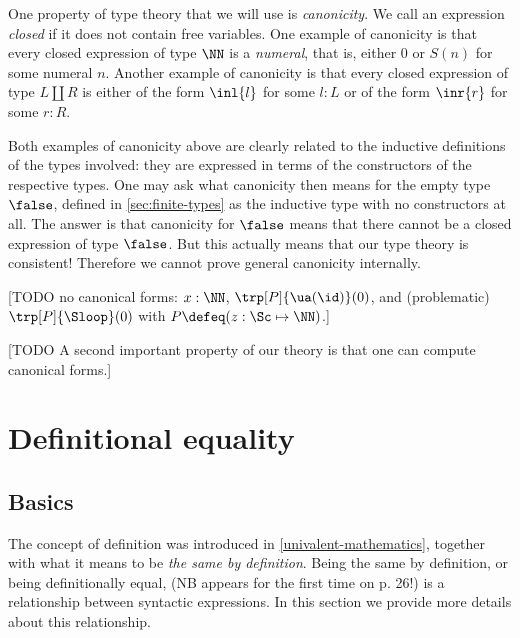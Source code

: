 One property of type theory that we will use is \emph{canonicity}.
We call an expression \emph{closed} if it does not contain free variables.
One example of canonicity is that every closed expression of type $\NN$
is a \emph{numeral}, that is, either $0$ or $S(n)$ for some numeral $n$.
Another example of canonicity is that every closed expression of 
type $L\coprod R$ is either of the form $\inl{l}$ for some $l:L$ or
of the form $\inr{r}$ for some $r:R$.

Both examples of canonicity above are clearly related to the
inductive definitions of the types involved: they are
expressed in terms of the constructors of the respective types.
One may ask what canonicity then means for the empty type $\false$,
defined in \cref{sec:finite-types} as the inductive type
with no constructors at all. The answer is that canonicity for $\false$
means that there cannot be a closed expression of type $\false$.
But this actually means that our type theory is consistent!
Therefore we cannot prove general canonicity internally.

[TODO no canonical forms: $x:\NN$, $\trp[P]{\ua(\id)}(0)$, and (problematic) $\trp[P]{\Sloop}(0)$
with $P\defeq (z:\Sc \mapsto \NN)$.]

[TODO A second important property of our theory is 
that one can compute canonical forms.]

\section{Definitional equality}
\label{sec:defeq}

\subsection{Basics}
\label{sec:defeq-basics}

The concept of definition was introduced in \cref{univalent-mathematics},
together with what it means to be \emph{the same by definition}. 
Being the same by definition, or being definitionally equal, 
(NB appears for the first time on p. 26!) 
is a relationship between syntactic expressions.
In this section we provide more details about this relationship.


